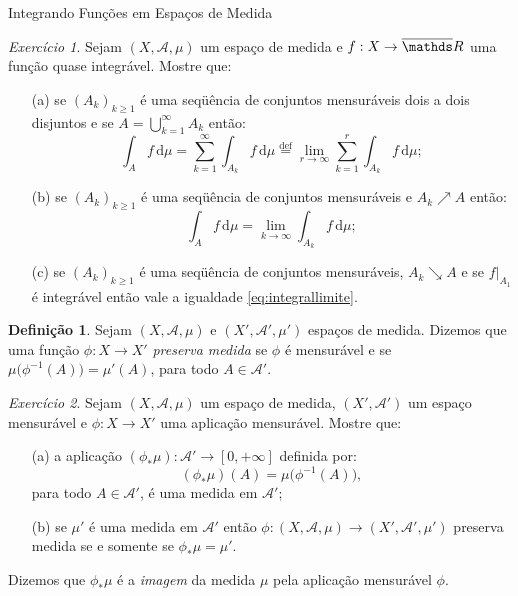 \documentclass[oneside,final,11pt]{amsbook}
\newcommand{\R}{\mathds R}
\newcommand{\dd}{\mathrm d}
\theoremstyle{remark}\newtheorem{exercise}{Exercício}[chapter]
\theoremstyle{remark}\newtheorem{*exercise}[exercise]{\hbox to 0pt{\hskip 0pt minus 1fil*}Exercício}
\theoremstyle{definition}\newtheorem{exdefin}{Definição}[chapter]
\theoremstyle{plain}\newtheorem{teo}{Teorema}[section]
\theoremstyle{plain}\newtheorem{lem}[teo]{Lema}
\theoremstyle{plain}\newtheorem{prop}[teo]{Proposição}
\theoremstyle{plain}\newtheorem{cor}[teo]{Corolário}
\theoremstyle{definition}\newtheorem{defin}[teo]{Definição}
\theoremstyle{remark}\newtheorem{rem}[teo]{Observação}
\theoremstyle{definition}\newtheorem{notation}[teo]{Notação}
\theoremstyle{definition}\newtheorem{convention}[teo]{Convenção}
\theoremstyle{definition}\newtheorem{example}[teo]{Exemplo}
\numberwithin{section}{chapter}
\numberwithin{equation}{section}
\begin{document}
\begin{chapter}{Integrando Funções em Espaços de Medida}
\begin{exercise}\label{exe:propintegralmedida}
Sejam $(X,\mathcal A,\mu)$ um espaço de medida e $f:X\to\overline\R$ uma função
quase integrável. Mostre que:
\begin{itemize}
\item[(a)] se $(A_k)_{k\ge1}$ é uma seqüência de conjuntos mensuráveis dois a dois disjuntos
e se $A=\bigcup_{k=1}^\infty A_k$ então:
\[\int_Af\,\dd\mu=\sum_{k=1}^\infty\int_{A_k}f\,\dd\mu\stackrel{\text{def}}=
\lim_{r\to\infty}\sum_{k=1}^r\int_{A_k}f\,\dd\mu;\]
\item[(b)] se $(A_k)_{k\ge1}$ é uma seqüência de conjuntos mensuráveis e $A_k\nearrow A$ então:
\begin{equation}\label{eq:integrallimite}
\int_Af\,\dd\mu=\lim_{k\to\infty}\int_{A_k}f\,\dd\mu;
\end{equation}
\item[(c)] se $(A_k)_{k\ge1}$ é uma seqüência de conjuntos mensuráveis, $A_k\searrow A$
e se $f\vert_{A_1}$ é integrável então vale a igualdade \eqref{eq:integrallimite}.
\end{itemize}
\end{exercise}

\begin{exdefin}\label{thm:measurepres}
Sejam $(X,\mathcal A,\mu)$ e $(X',\mathcal A',\mu')$ espaços de medida. Dizemos que uma função
$\phi:X\to X'$ {\em preserva medida\/}
se $\phi$ é mensurável e se $\mu\big(\phi^{-1}(A)\big)=\mu'(A)$, para todo $A\in\mathcal A'$.
\end{exdefin}

\begin{exercise}\label{exe:phistarmu}
Sejam $(X,\mathcal A,\mu)$ um espaço de medida, $(X',\mathcal A')$ um espaço mensurável e $\phi:X\to X'$ uma aplicação
mensurável. Mostre que:
\begin{itemize}
\item[(a)] a aplicação $(\phi_*\mu):\mathcal A'\to[0,+\infty]$ definida por:\index[simbolos]{$\phi_*\mu$}
\[(\phi_*\mu)(A)=\mu\big(\phi^{-1}(A)\big),\]
para todo $A\in\mathcal A'$, é uma medida em $\mathcal A'$;
\item[(b)] se $\mu'$ é uma medida em $\mathcal A'$ então $\phi:(X,\mathcal A,\mu)\to(X',\mathcal A',\mu')$ preserva
medida se e somente se $\phi_*\mu=\mu'$.
\end{itemize}
Dizemos que $\phi_*\mu$ é a {\em imagem\/} da medida $\mu$
pela aplicação mensurável $\phi$.
\end{exercise}


\end{chapter}
\end{document}
